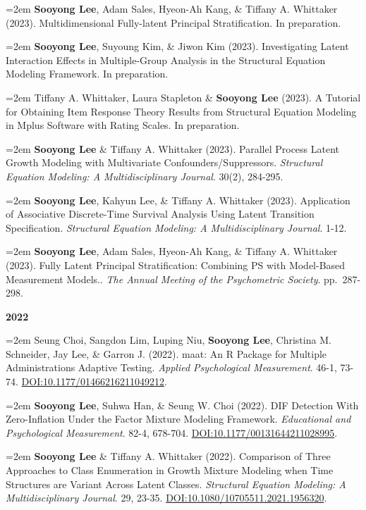 \documentclass[11pt,letterpaper,]{awesome-me}
\begin{document}
\hangindent=2em  \textbf{Sooyong Lee}, Adam Sales, Hyeon-Ah
Kang, \& Tiffany A. Whittaker (2023). Multidimensional Fully-latent
Principal Stratification. In preparation.

\hangindent=2em  \textbf{Sooyong Lee}, Suyoung Kim, \& Jiwon
Kim (2023). Investigating Latent Interaction Effects in Multiple-Group
Analysis in the Structural Equation Modeling Framework. In preparation.

\hangindent=2em  Tiffany A. Whittaker, Laura Stapleton \&
\textbf{Sooyong Lee} (2023). A Tutorial for Obtaining Item Response
Theory Results from Structural Equation Modeling in Mplus Software with
Rating Scales. In preparation.

\hangindent=2em  \textbf{Sooyong Lee} \& Tiffany A.
Whittaker (2023). Parallel Process Latent Growth Modeling with
Multivariate Confounders/Suppressors. \emph{Structural Equation
Modeling: A Multidisciplinary Journal}. 30(2), 284-295.

\hangindent=2em  \textbf{Sooyong Lee}, Kahyun Lee, \&
Tiffany A. Whittaker (2023). Application of Associative Discrete-Time
Survival Analysis Using Latent Transition Specification.
\emph{Structural Equation Modeling: A Multidisciplinary Journal}. 1-12.

\hangindent=2em  \textbf{Sooyong Lee}, Adam Sales, Hyeon-Ah
Kang, \& Tiffany A. Whittaker (2023). Fully Latent Principal
Stratification: Combining PS with Model-Based Measurement Models..
\emph{The Annual Meeting of the Psychometric Society}. pp.~287-298.

\setlength{\leftskip}{0cm}

\textbf{2022}

\setlength{\leftskip}{0.5cm}

\hangindent=2em  Seung Choi, Sangdon Lim, Luping Niu,
\textbf{Sooyong Lee}, Christina M. Schneider, Jay Lee, \& Garron J.
(2022). maat: An R Package for Multiple Administrations Adaptive
Testing. \emph{Applied Psychological Measurement}. 46-1, 73-74.
\url{DOI:10.1177/01466216211049212}.

\hangindent=2em  \textbf{Sooyong Lee}, Suhwa Han, \& Seung
W. Choi (2022). DIF Detection With Zero-Inflation Under the Factor
Mixture Modeling Framework. \emph{Educational and Psychological
Measurement}. 82-4, 678-704. \url{DOI:10.1177/00131644211028995}.

\hangindent=2em  \textbf{Sooyong Lee} \& Tiffany A.
Whittaker (2022). Comparison of Three Approaches to Class Enumeration in
Growth Mixture Modeling when Time Structures are Variant Across Latent
Classes. \emph{Structural Equation Modeling: A Multidisciplinary
Journal}. 29, 23-35. \url{DOI:10.1080/10705511.2021.1956320}.
\end{document}
